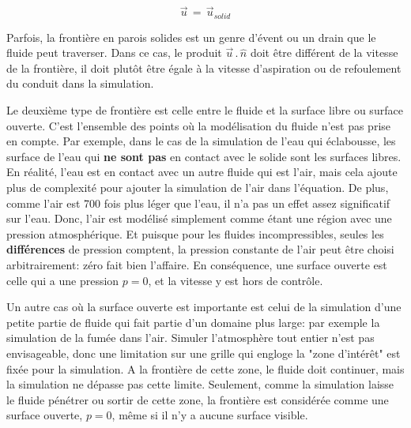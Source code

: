 \documentclass[11pt]{report}
\begin{document}
\begin{equation}
\overrightarrow{u} \,=\, \overrightarrow{u}\!\!_{solid}
\end{equation}

Parfois, la frontière en parois solides est un genre d'évent ou un drain que le fluide peut traverser. Dans ce cas, le produit $ \overrightarrow{u}\,.\,\hat{n} $ doit être différent de la vitesse de la frontière, il doit plutôt être égale à la vitesse d'aspiration ou de refoulement du conduit dans la simulation.\newline


Le deuxième type de frontière est celle entre le fluide et la surface libre ou surface ouverte. C'est l'ensemble des points où la modélisation du fluide n'est pas prise en compte. Par exemple, dans le cas de la simulation de l'eau qui éclabousse, les surface de l'eau qui \textbf{ne sont pas} en contact avec le solide sont les surfaces libres. En réalité, l'eau est en contact avec un autre fluide qui est l'air, mais cela ajoute plus de complexité  pour ajouter la simulation de l'air dans l'équation. De plus, comme l'air est 700 fois plus léger que l'eau, il n'a pas un effet assez significatif sur l'eau. Donc, l'air est modélisé simplement comme étant une région avec une pression atmosphérique. Et puisque pour les fluides incompressibles, seules les \textbf{ différences} de pression comptent, la pression constante de l'air peut être choisi arbitrairement: zéro fait bien l'affaire. En conséquence, une surface ouverte est celle qui a une pression $ p = 0 $, et la vitesse y est hors de contrôle.\newline

Un autre cas où la surface ouverte est importante est celui de la simulation d'une petite partie de fluide qui fait partie d'un domaine plus large: par exemple la simulation de la fumée dans l'air. Simuler l'atmosphère tout entier n'est pas envisageable, donc une limitation sur une grille qui engloge la "zone d'intérêt" est fixée pour la simulation. A la frontière de cette zone, le fluide doit continuer, mais la simulation ne dépasse pas cette limite. Seulement, comme la simulation laisse le fluide pénétrer ou sortir de cette zone, la frontière est considérée comme une surface ouverte, $ p = 0 $, même si il n'y a aucune surface visible.\newline
\end{document}

